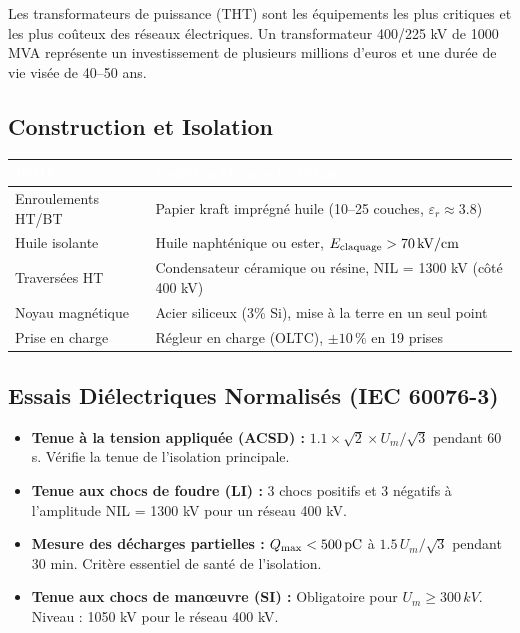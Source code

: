 \documentclass[12pt, a4paper, twoside]{report}
\begin{document}
Les transformateurs de puissance (THT) sont les équipements les plus critiques et
les plus coûteux des réseaux électriques. Un transformateur 400/225 kV de 1000 MVA
représente un investissement de plusieurs millions d'euros et une durée de vie visée
de 40--50 ans.

\subsection{Construction et Isolation}

\begin{center}
\begin{tabularx}{\textwidth}{lX}
\toprule
\rowcolor{darkblue}
\textcolor{white}{\textbf{Partie}} &
\textcolor{white}{\textbf{Isolation et caractéristiques}} \\
\midrule
Enroulements HT/BT & Papier kraft imprégné huile (10--25 couches, $\varepsilon_r \approx 3.8$) \\
\rowcolor{lightgray}
Huile isolante & Huile naphténique ou ester, $E_{\rm claquage} > 70\,\si{kV/cm}$ \\
Traversées HT  & Condensateur céramique ou résine, NIL = 1300 kV (côté 400 kV) \\
\rowcolor{lightgray}
Noyau magnétique & Acier siliceux (3\% Si), mise à la terre en un seul point \\
Prise en charge   & Régleur en charge (OLTC), $\pm 10\,\%$ en 19 prises \\
\bottomrule
\end{tabularx}
\end{center}

\subsection{Essais Diélectriques Normalisés (IEC 60076-3)}

\begin{itemize}
  \item \textbf{Tenue à la tension appliquée (ACSD) :} $1.1 \times \sqrt{2} \times U_m/\sqrt{3}$
    pendant 60 s. Vérifie la tenue de l'isolation principale.
  \item \textbf{Tenue aux chocs de foudre (LI) :} 3 chocs positifs et 3 négatifs
    à l'amplitude NIL = 1300 kV pour un réseau 400 kV.
  \item \textbf{Mesure des décharges partielles :} $Q_{\rm max} < 500\,\si{pC}$ à
    $1.5\,U_m/\sqrt{3}$ pendant 30 min. Critère essentiel de santé de l'isolation.
  \item \textbf{Tenue aux chocs de manœuvre (SI) :} Obligatoire pour $U_m \geq 300\,\si{kV}$.
    Niveau : 1050 kV pour le réseau 400 kV.
\end{itemize}
\end{document}

